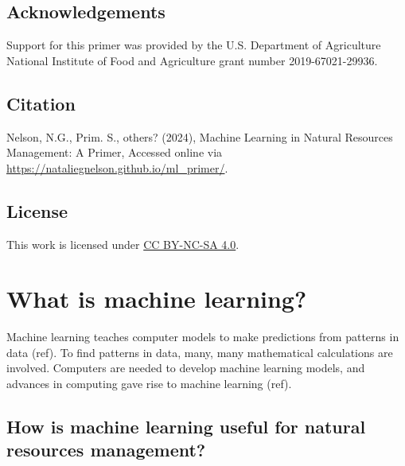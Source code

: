 \documentclass[
]{book}
\begin{document}
\hypertarget{acknowledgements}{%
\section{Acknowledgements}\label{acknowledgements}}

Support for this primer was provided by the U.S. Department of Agriculture National Institute of Food and Agriculture grant number 2019-67021-29936.

\hypertarget{citation}{%
\section{Citation}\label{citation}}

Nelson, N.G., Prim. S., others? (2024), Machine Learning in Natural Resources Management: A Primer, Accessed online via \url{https://nataliegnelson.github.io/ml_primer/}.

\hypertarget{license}{%
\section{License}\label{license}}

This work is licensed under \href{https://creativecommons.org/licenses/by-nc-sa/4.0/?ref=chooser-v1}{CC BY-NC-SA 4.0}.

\hypertarget{whatisml}{%
\chapter{What is machine learning?}\label{whatisml}}

Machine learning teaches computer models to make predictions from patterns in data (ref). To find patterns in data, many, many mathematical calculations are involved. Computers are needed to develop machine learning models, and advances in computing gave rise to machine learning (ref).

\hypertarget{how-is-machine-learning-useful-for-natural-resources-management}{%
\section{How is machine learning useful for natural resources management?}\label{how-is-machine-learning-useful-for-natural-resources-management}}
\end{document}
